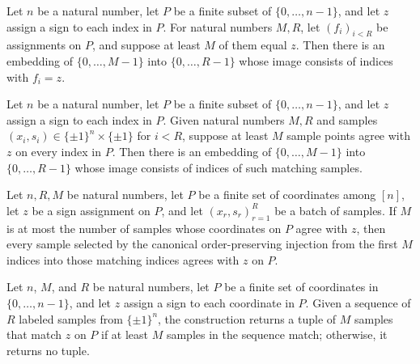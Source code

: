 \begin{definition}
\label{FABL.fixedMatchingIndexEmbedding}
\leanok
{}
Let $n$ be a natural number, let $P$ be a finite subset of $\{0,\ldots,n-1\}$, and let
$z$ assign a sign to each index in $P$. For natural numbers $M,R$, let $(f_i)_{i<R}$ be
assignments on $P$, and suppose at least $M$ of them equal $z$. Then there is an
embedding of $\{0,\ldots,M-1\}$ into $\{0,\ldots,R-1\}$ whose image consists of indices
with $f_i=z$.
\end{definition}

\begin{definition}
\label{FABL.juntaMatchingIndexEmbedding}
\leanok
{}
Let $n$ be a natural number, let $P$ be a finite subset of $\{0,\ldots,n-1\}$, and let
$z$ assign a sign to each index in $P$. Given natural numbers $M,R$ and samples
$(x_i,s_i)\in\{\pm1\}^n\times\{\pm1\}$ for $i<R$, suppose at least $M$ sample points
agree with $z$ on every index in $P$. Then there is an embedding of $\{0,\ldots,M-1\}$
into $\{0,\ldots,R-1\}$ whose image consists of indices of such matching samples.
\end{definition}

\begin{theorem}
\label{FABL.juntaMatchingIndexEmbedding_matches}
\leanok
{}
Let $n,R,M$ be natural numbers, let $P$ be a finite set of coordinates among $[n]$, let
$z$ be a sign assignment on $P$, and let $(x_r,s_r)_{r=1}^R$ be a batch of samples. If
$M$ is at most the number of samples whose coordinates on $P$ agree with $z$, then every
sample selected by the canonical order-preserving injection from the first $M$ indices
into those matching indices agrees with $z$ on $P$.
\end{theorem}

\begin{definition}
\label{FABL.takeMatchingJuntaExamples}
\leanok
{}
Let $n$, $M$, and $R$ be natural numbers, let $P$ be a finite set of coordinates in
$\{0,\ldots,n-1\}$, and let $z$ assign a sign to each coordinate in $P$. Given a
sequence of $R$ labeled samples from $\{\pm1\}^n$, the construction returns a tuple of
$M$ samples that match $z$ on $P$ if at least $M$ samples in the sequence match;
otherwise, it returns no tuple.
\end{definition}

